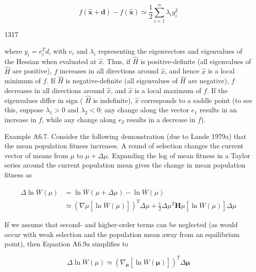 \documentclass{article}
\begin{document}
\begin{equation}
f(\widehat{\mathbf{x}}+\mathbf{d})-f(\widehat{\mathbf{x}})\simeq\frac{1}{2}\sum_{i=1}^{n}\lambda_{i}y_{i}^{2}
\end{equation}

1317

where  $ y_i = e_i^T d $, with  $ e_i $ and  $ \lambda_i $ representing the eigenvectors and eigenvalues of the Hessian when evaluated at  $ \hat{x} $. Thus, if  $ \hat{H} $ is positive-definite (all eigenvalues of  $ \hat{H} $ are positive),  $ f $ increases in all directions around  $ \hat{x} $, and hence  $ \hat{x} $ is a local minimum of  $ f $. If  $ \hat{H} $ is negative-definite (all eigenvalues of  $ \hat{H} $ are negative),  $ f $ decreases in all directions around  $ \hat{x} $, and  $ \hat{x} $ is a local maximum of  $ f $. If the eigenvalues differ in sign ( $ \hat{H} $ is indefinite),  $ \hat{x} $ corresponds to a saddle point (to see this, suppose  $ \lambda_1 > 0 $ and  $ \lambda_2 < 0 $; any change along the vector  $ e_1 $ results in an increase in  $ f $, while any change along  $ e_2 $ results in a decrease in  $ f $).

Example A6.7. Consider the following demonstration (due to Lande 1979a) that the mean population fitness increases. A round of selection changes the current vector of means from  $ \mu $ to  $ \mu + \Delta\mu $. Expanding the log of mean fitness in a Taylor series around the current population mean gives the change in mean population fitness as

\begin{equation}
\begin{align*}\Delta\ln\overline{W}(\mu)&=\ln\overline{W}(\mu+\Delta\mu)-\ln\overline{W}(\mu)\\&\simeq\left(\nabla\mu\left[\ln\overline{W}(\mu)\right]\right)^{T}\Delta\mu+\frac{1}{2}\Delta\mu^{T}\mathbf{H}\mu\left[\ln\overline{W}(\mu)\right]\Delta\mu\end{align*}
\end{equation}

If we assume that second- and higher-order terms can be neglected (as would occur with weak selection and the population mean away from an equilibrium point), then Equation A6.9a simplifies to

\begin{equation}
\Delta\ln\overline{W}(\mu)\simeq\left(\nabla_{\boldsymbol{\mu}}[\ln\overline{W}(\boldsymbol{\mu})]\right)^{T}\Delta\boldsymbol{\mu}
\end{equation}
\end{document}
